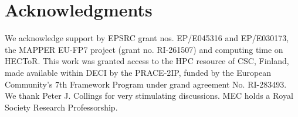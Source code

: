 \documentclass[8.5pt,twoside,twocolumn]{article}
\begin{document}
%




\section*{Acknowledgments}
We acknowledge support by EPSRC grant nos. EP/E045316 and EP/E030173, 
the MAPPER EU-FP7 project (grant no. RI-261507) and computing time on HECToR.
This work was granted access to the HPC resource of CSC, Finland, made available 
within DECI by the PRACE-2IP, funded by the European Community's 7th Framework 
Program under grand agreement No. RI-283493. We thank Peter J. Collings 
for very stimulating discussions. 
MEC holds a Royal Society Research Professorship.
\end{document}
